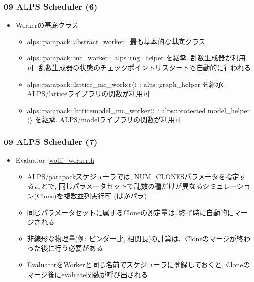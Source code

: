 \begin{frame}[fragile]
  \frametitle{09 ALPS Scheduler (6)}
  \begin{itemize}
    \item Workerの基底クラス
      \begin{itemize}
      \item alps::parapack::abstract\_worker : 最も基本的な基底クラス
      \item alps::parapack::mc\_worker : alps::rng\_helper を継承. 乱数生成器が利用可. 乱数生成器の状態のチェックポイントリスタートも自動的に行われる
      \item alps::parapack::lattice\_mc\_worker$\langle\rangle$ : alps::graph\_helper を継承. ALPS/latticeライブラリの関数が利用可
      \item alps::parapack::latticemodel\_mc\_worker$\langle\rangle$ : alps::protected model\_helper$\langle\rangle$ を継承. ALPS/modelライブラリの関数が利用可
      \end{itemize}
  \end{itemize}
\end{frame}

\begin{frame}[fragile]
  \frametitle{09 ALPS Scheduler (7)}
  \begin{itemize}
    \item Evaluator: \href{https://github.com/cmsi/alps-tutorial/blob/develop/alpsize/09-wolff_worker.h}{wolff\_worker.h}
      \begin{itemize}
      \item ALPS/parapackスケジューラでは, NUM\_CLONESパラメータを指定することで, 同じパラメータセットで乱数の種だけが異なるシミュレーション(Clone)を複数並列実行可 (ばかパラ)
      \item 同じパラメータセットに属するCloneの測定量は, 終了時に自動的にマージされる
      \item 非線形な物理量(例: ビンダー比, 相関長)の計算は、Cloneのマージが終わった後に行う必要がある
      \item EvaluatorをWorkerと同じ名前でスケジューラに登録しておくと, Cloneのマージ後にevaluate関数が呼び出される
      \end{itemize}
  \end{itemize}
\end{frame}

